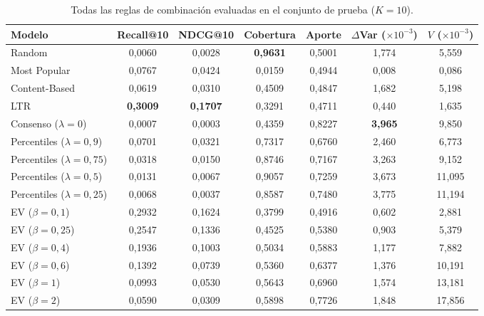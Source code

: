 \begin{table}[ht]
\centering
\footnotesize
\caption{Todas las reglas de combinación evaluadas en el conjunto de prueba ($K=10$).}
\label{tab:anexo_activo_completa}
\setlength{\tabcolsep}{4pt}
\begin{tabular}{@{}l cccccc@{}}
\toprule
\textbf{Modelo} & \textbf{Recall@10} & \textbf{NDCG@10} & \textbf{Cobertura} & \textbf{Aporte} & \shortstack{\textbf{$\Delta$Var}\\($\times10^{-3}$)} & \shortstack{\textbf{$V$}\\($\times10^{-3}$)} \\ \midrule
Random & 0{,}0060 & 0{,}0028 & \textbf{0{,}9631} & 0{,}5001 & 1{,}774 & 5{,}559 \\
Most Popular & 0{,}0767 & 0{,}0424 & 0{,}0159 & 0{,}4944 & 0{,}008 & 0{,}086 \\
Content-Based & 0{,}0619 & 0{,}0310 & 0{,}4509 & 0{,}4847 & 1{,}682 & 5{,}198 \\
LTR & \textbf{0{,}3009} & \textbf{0{,}1707} & 0{,}3291 & 0{,}4711 & 0{,}440 & 1{,}635 \\
\midrule
Consenso ($\lambda=0$) & 0{,}0007 & 0{,}0003 & 0{,}4359 & 0{,}8227 & \textbf{3{,}965} & 9{,}850 \\
Percentiles ($\lambda=0{,}9$) & 0{,}0701 & 0{,}0321 & 0{,}7317 & 0{,}6760 & 2{,}460 & 6{,}773 \\
Percentiles ($\lambda=0{,}75$) & 0{,}0318 & 0{,}0150 & 0{,}8746 & 0{,}7167 & 3{,}263 & 9{,}152 \\
Percentiles ($\lambda=0{,}5$) & 0{,}0131 & 0{,}0067 & 0{,}9057 & 0{,}7259 & 3{,}673 & 11{,}095 \\
Percentiles ($\lambda=0{,}25$) & 0{,}0068 & 0{,}0037 & 0{,}8587 & 0{,}7480 & 3{,}775 & 11{,}194 \\
\midrule
EV ($\beta=0{,}1$) & 0{,}2932 & 0{,}1624 & 0{,}3799 & 0{,}4916 & 0{,}602 & 2{,}881 \\
EV ($\beta=0{,}25$) & 0{,}2547 & 0{,}1336 & 0{,}4525 & 0{,}5380 & 0{,}903 & 5{,}379 \\
EV ($\beta=0{,}4$) & 0{,}1936 & 0{,}1003 & 0{,}5034 & 0{,}5883 & 1{,}177 & 7{,}882 \\
EV ($\beta=0{,}6$) & 0{,}1392 & 0{,}0739 & 0{,}5360 & 0{,}6377 & 1{,}376 & 10{,}191 \\
EV ($\beta=1$) & 0{,}0993 & 0{,}0530 & 0{,}5643 & 0{,}6960 & 1{,}574 & 13{,}181 \\
EV ($\beta=2$) & 0{,}0590 & 0{,}0309 & 0{,}5898 & 0{,}7726 & 1{,}848 & 17{,}856 \\
\midrule

\end{tabular}
\end{table}
